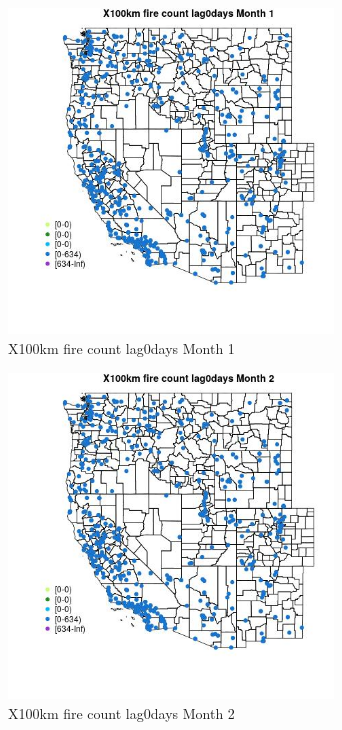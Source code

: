 \begin{figure} 
\centering  
\includegraphics[width=0.77\textwidth]{Code_Outputs/Report_ML_input_PM25_Step4_part_e_de_duplicated_aves_compiled_2019-05-14wNAs_MapObsMo1X100km_fire_count_lag0days.jpg} 
\caption{\label{fig:Report_ML_input_PM25_Step4_part_e_de_duplicated_aves_compiled_2019-05-14wNAsMapObsMo1X100km_fire_count_lag0days}X100km fire count lag0days Month 1} 
\end{figure} 
 

\clearpage 

\begin{figure} 
\centering  
\includegraphics[width=0.77\textwidth]{Code_Outputs/Report_ML_input_PM25_Step4_part_e_de_duplicated_aves_compiled_2019-05-14wNAs_MapObsMo2X100km_fire_count_lag0days.jpg} 
\caption{\label{fig:Report_ML_input_PM25_Step4_part_e_de_duplicated_aves_compiled_2019-05-14wNAsMapObsMo2X100km_fire_count_lag0days}X100km fire count lag0days Month 2} 
\end{figure} 
 

